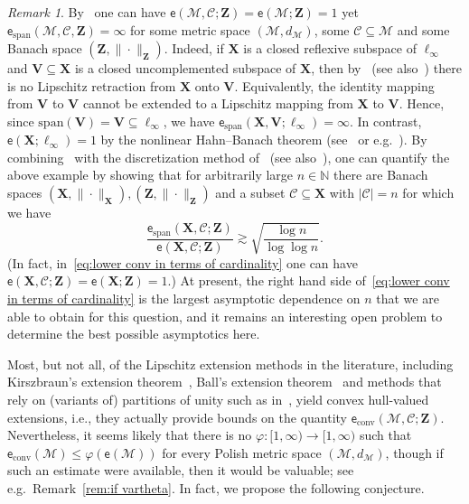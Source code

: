 \documentclass[11pt,reqno]{amsart}
\renewcommand{\le}{\leqslant}
\newcommand{\X}{\mathbf X}
\theoremstyle{remark}
\newtheorem{remark}[theorem]{Remark}
\newcommand{\MM}{\mathcal{M}}
\renewcommand{\subset}{\subseteq}
\newcommand{\N}{\mathbb N}
\newcommand{\ee}{\mathsf{e}}
\newcommand{\bfZ}{\mathbf{Z}}
\newcommand{\sub}{\mathscr{C}}
\renewcommand{\1}{\mathbf 1}
\newcommand{\conv}{\mathrm{conv}}
\newcommand{\spn}{\mathrm{ span}}
\begin{document}
\begin{remark}\label{rem:lindenstrauss span}
By~\cite{Lin64}  one can have $\ee(\MM,\sub;\bfZ)=\ee(\MM;\bfZ)=1$ yet $\ee_{\spn}(\MM,\sub,\bfZ)=\infty$ for some metric space $(\MM,d_\MM)$, some $\sub\subset \MM$ and some Banach space $(\bfZ,\|\cdot\|_\bfZ)$. Indeed, if $\X$ is a closed reflexive subspace of $\ell_\infty$ and $\mathbf{V}\subset \X$ is a closed uncomplemented subspace of $\X$, then by~\cite{Lin64} (see also~\cite[Corollary~7.3]{BL00}) there is no Lipschitz retraction from $\X$ onto $\mathbf{V}$. Equivalently, the identity mapping from $\mathbf{V}$ to $\mathbf{V}$ cannot be extended to a Lipschitz mapping from $\X$ to $\mathbf{V}$. Hence, since $\spn(\mathbf{V})=\mathbf{V}\subset \ell_\infty$, we have  $\ee_\spn(\X,\mathbf{V};\ell_\infty)=\infty$. In contrast, $\ee(\X;\ell_\infty)=1$ by the nonlinear Hahn--Banach theorem (see~\cite{McS34} or e.g.~\cite[Lemma~1.1]{BL00}). By combining~\cite{Sob41} with the discretization method of~\cite{JL84} (see also~\cite{MM16}), one can quantify the above example by showing that for arbitrarily large $n\in \N$ there are Banach spaces $(\X,\|\cdot\|_{\X}), (\bfZ,\|\cdot\|_\bfZ)$ and a subset $\sub\subset \X$ with $|\sub|=n$ for which we have
\begin{equation}\label{eq:lower conv in terms of cardinality}
\frac{\ee_\spn (\X,\sub;\bfZ)}{\ee (\X,\sub;\bfZ)}\gtrsim \sqrt{\frac{\log n}{\log\log n}}.
\end{equation}
(In fact, in~\eqref{eq:lower conv in terms of cardinality} one can have $\ee (\X,\sub;\bfZ)=\ee (\X;\bfZ)=1$.) At present, the right hand side of~\eqref{eq:lower conv in terms of cardinality} is the largest asymptotic dependence on $n$ that we are able to obtain for this question, and it remains an  interesting open problem to determine the best possible asymptotics here.
\end{remark}



Most, but not all, of the Lipschitz extension methods in the literature, including Kirszbraun's extension theorem~\cite{Kirsz34}, Ball's extension theorem~\cite{Bal92} and methods that rely on (variants of) partitions of unity such as in~\cite{JLS86,LN05,LS05,BB06}, yield convex hull-valued extensions, i.e., they actually provide bounds on the quantity $\ee_{\conv}(\MM,\sub;\bfZ)$. Nevertheless, it seems likely that there is no  $\varphi:[1,\infty)\to [1,\infty)$ such that $\ee_\conv(\MM)\le \varphi(\ee(\MM))$ for every Polish metric space $(\MM,d_\MM)$, though if such an estimate were available, then it would be valuable; see e.g.~Remark~\ref{rem:if vartheta}. In fact, we propose the following conjecture.
\end{document}
